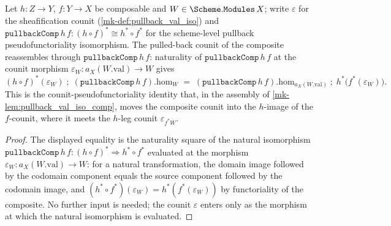\begin{lemma}
  \label{mk-lem:pullback_val_iso_comp_counit}
  \lean{}
  Let \(h : Z \to Y\), \(f : Y \to X\) be composable and \(W \in \Scheme.\mathtt{Modules}\,X\);
  write \(\varepsilon\) for the sheafification counit (\ref{mk-def:pullback_val_iso}) and
  \(\mathtt{pullbackComp}\,h\,f : (h\circ f)^{*} \cong h^{*}\circ f^{*}\) for the scheme-level
  pullback pseudofunctoriality isomorphism. The pulled-back counit of the composite reassembles
  through \(\mathtt{pullbackComp}\,h\,f\): naturality of \(\mathtt{pullbackComp}\,h\,f\) at the
  counit morphism \(\varepsilon_W : a_X(W.\mathrm{val}) \to W\) gives
  \[
    (h\circ f)^{*}(\varepsilon_W) \;\mathbin{;}\; (\mathtt{pullbackComp}\,h\,f).\mathrm{hom}_W
      \;=\;
    (\mathtt{pullbackComp}\,h\,f).\mathrm{hom}_{a_X(W.\mathrm{val})} \;\mathbin{;}\;
      h^{*}\!\bigl(f^{*}(\varepsilon_W)\bigr).
  \]
  This is the counit-pseudofunctoriality identity that, in the assembly of
  \ref{mk-lem:pullback_val_iso_comp}, moves the composite counit into the \(h\)-image of the
  \(f\)-counit, where it meets the \(h\)-leg counit \(\varepsilon_{f^{*}W}\).
\end{lemma}
\begin{proof}
  The displayed equality is the naturality square of the natural isomorphism
  \(\mathtt{pullbackComp}\,h\,f : (h\circ f)^{*} \Rightarrow h^{*}\circ f^{*}\) evaluated at the
  morphism \(\varepsilon_W : a_X(W.\mathrm{val}) \to W\): for a natural transformation, the domain
  image followed by the codomain component equals the source component followed by the codomain
  image, and \((h^{*}\circ f^{*})(\varepsilon_W) = h^{*}(f^{*}(\varepsilon_W))\) by functoriality
  of the composite. No further input is needed; the counit \(\varepsilon\) enters only as the
  morphism at which the natural isomorphism is evaluated.
\end{proof}
